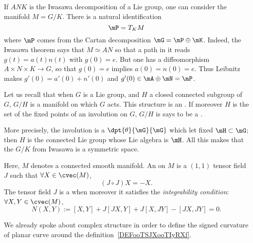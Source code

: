 If $ANK$ is the Iwasawa decomposition of a Lie group, one can consider the manifold $M=G/K$. There is a natural identification
\[
	\mP=T_KM
\]
where $\mP$ comes from the Cartan decomposition $\mG=\mP\oplus\mK$. Indeed, the Iwasawa theorem says that $M\simeq AN$ so that a path in it reads $g(t)=a(t)n(t)$ with $g(0)=e$. But one has a diffeomorphism $A\times N\times K\to G$, so that $g(0)=e$ implies $a(0)=n(0)=e$. Thus Leibnitz makes $g'(0)=a'(0)+n'(0)$ and $g'(0)\in\mA\oplus\mN=\mP$.

Let us recall that when $G$ is a Lie group, and $H$ a closed connected subgroup of $G$, $G/H$ is a manifold on which $G$ acts. This structure is an . If moreover $H$ is the set of the fixed points of an involution on $G$, $G/H$ is says to be a .

More precisely, the involution is a $\dpt{\theta}{\mG}{\mG}$ which let fixed $\mH\subset\mG$; then $H$ is the connected Lie group whose Lie algebra is $\mH$. All this makes that the $G/K$ from Iwasawa is a symmetric space.

\begin{definition}  \label{DefCLtjFtD}
	Here, $M$ denotes a connected smooth manifold. An  on $M$ is a $(1,1)$ tensor field $J$ such that $\forall X\in\cvec(M)$,
	\begin{equation}
		(J\circ J)X=-X.
	\end{equation}
	The tensor field $J$ is a  when moreover it satisfies the \emph{integrability condition}: $\forall X,Y\in\cvec(M)$,
	\begin{equation}  \label{DefComplStruct}
		N(X,Y):=[X,Y]+J[JX,Y]+J[X,JY]-[JX,JY]=0.
	\end{equation}
\end{definition}
We already spoke about complex structure in order to define the signed curvature of planar curve around the definition~\ref{DEFooTSJXooTIyRXf}.

